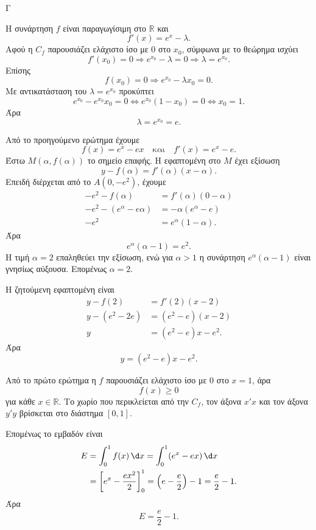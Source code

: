 \begin{thema}{Γ}
\begin{erwthma}
\item Η συνάρτηση $f$ είναι παραγωγίσιμη στο $\mathbb{R}$ και
\[
f'(x)=e^x-\lambda.
\]
Αφού η $C_f$ παρουσιάζει ελάχιστο ίσο με $0$ στο $x_0$, σύμφωνα με το θεώρημα  ισχύει
\[
f'(x_0)=0\Rightarrow e^{x_0}-\lambda=0\Rightarrow \lambda=e^{x_0}.
\]
Επίσης
\[
f(x_0)=0\Rightarrow e^{x_0}-\lambda x_0=0.
\]
Με αντικατάσταση του $\lambda=e^{x_0}$ προκύπτει
\[
e^{x_0}-e^{x_0}x_0=0
\Leftrightarrow e^{x_0}(1-x_0)=0
\Leftrightarrow x_0=1.
\]
Άρα
\[
\lambda=e^{x_0}=e.
\]

\item Από το προηγούμενο ερώτημα έχουμε
\[
f(x)=e^x-ex
\quad\text{και}\quad
f'(x)=e^x-e.
\]
Έστω $M(\alpha,f(\alpha))$ το σημείο επαφής. Η εφαπτομένη στο $M$ έχει εξίσωση
\[
y-f(\alpha)=f'(\alpha)(x-\alpha).
\]
Επειδή διέρχεται από το $A(0,-e^2)$, έχουμε
\begin{align*}
-e^2-f(\alpha)&=f'(\alpha)(0-\alpha)\\
-e^2-\left(e^\alpha-e\alpha\right)&=-\alpha(e^\alpha-e)\\
-e^2&=e^\alpha(1-\alpha).
\end{align*}
Άρα
\[
e^\alpha(\alpha-1)=e^2.
\]
Η τιμή $\alpha=2$ επαληθεύει την εξίσωση, ενώ για $\alpha>1$ η συνάρτηση $e^\alpha(\alpha-1)$ είναι γνησίως αύξουσα. Επομένως $\alpha=2$.

Η ζητούμενη εφαπτομένη είναι
\begin{align*}
y-f(2)&=f'(2)(x-2)\\
y-\left(e^2-2e\right)&=(e^2-e)(x-2)\\
y&=(e^2-e)x-e^2.
\end{align*}
Άρα
\[
{y=(e^2-e)x-e^2}.
\]

\item Από το πρώτο ερώτημα η $f$ παρουσιάζει ελάχιστο ίσο με $0$ στο $x=1$, άρα
\[
f(x)\geq0
\]
για κάθε $x\in\mathbb{R}$. Το χωρίο που περικλείεται από την $C_f$, τον άξονα $x'x$ και τον άξονα $y'y$ βρίσκεται στο διάστημα $[0,1]$.

Επομένως το εμβαδόν είναι
\begin{align*}
E&=\int_0^1 f(x)\,\d x
=\int_0^1 (e^x-ex)\,\d x\\
&=\left[e^x-\frac{e x^2}{2}\right]_0^1
=\left(e-\frac{e}{2}\right)-1
=\frac{e}{2}-1.
\end{align*}
Άρα
\[
{E=\frac{e}{2}-1}.
\]


\end{erwthma}
\end{thema}
